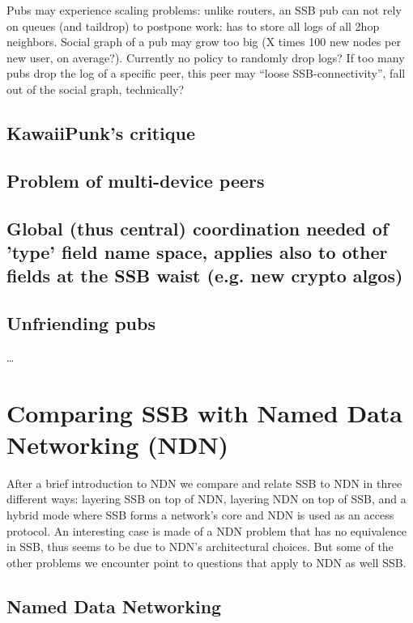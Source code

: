 \documentclass[sigconf]{acmart}
\begin{document}
Pubs may experience scaling problems: unlike routers, an SSB pub can
not rely on queues (and taildrop) to postpone work: has to store all
logs of all 2hop neighbors. Social graph of a pub may grow too big (X
times 100 new nodes per new user, on average?). Currently no policy to
randomly drop logs? If too many pubs drop the log of a specific peer,
this peer may ``loose SSB-connectivity'', fall out of the social
graph, technically?

\subsection{KawaiiPunk's critique}

\subsection{Problem of multi-device peers}

\subsection{Global (thus central) coordination needed of 'type' field
  name space, applies also  to other fields at the SSB waist (e.g. new
  crypto algos)}

\subsection{Unfriending pubs}
\ldots

\section{Comparing SSB with Named Data Networking (NDN)}

After a brief introduction to NDN we compare and relate SSB to NDN in
three different ways: layering SSB on top of NDN, layering NDN on top
of SSB, and a hybrid mode where SSB forms a network's core and NDN is
used as an access protocol. An interesting case is made of a NDN
problem that has no equivalence in SSB, thus seems to be due to NDN's
architectural choices. But some of the other problems we encounter
point to questions that apply to NDN as well SSB.

\subsection{Named Data Networking}
\end{document}
